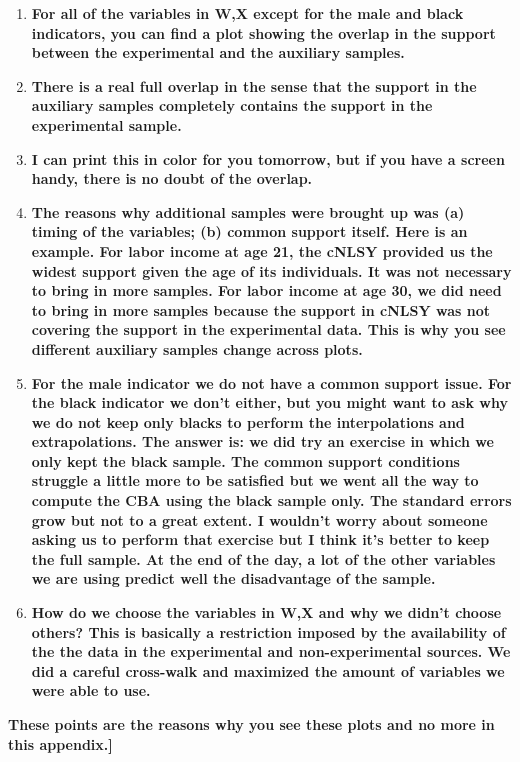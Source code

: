 \begin{enumerate}
\item \textbf{For all of the variables in W,X except for the male and black indicators, you can find a plot showing the overlap in the support between the experimental and the auxiliary samples.} 

\item \textbf{There is a real full overlap in the sense that the support in the auxiliary samples completely contains the support in the experimental sample.} 

\item \textbf{I can print this in color for you tomorrow, but if you have a screen handy, there is no doubt of the overlap.} 

\item \textbf{The reasons why additional samples were brought up was (a) timing of the variables; (b) common support itself. Here is an example. For labor income at age 21, the cNLSY provided us the widest support given the age of its individuals. It was not necessary to bring in more samples. For labor income at age 30, we did need to bring in more samples because the support in cNLSY was not covering the support in the experimental data. This is why you see different auxiliary samples change across plots.}

\item \textbf{For the male indicator we do not have a common support issue. For the black indicator we don't either, but you might want to ask why we do not keep only blacks to perform the interpolations and extrapolations. The answer is: we did try an exercise in which we only kept the black sample. The common support conditions struggle a little more to be satisfied but we went all the way to compute the CBA using the black sample only. The standard errors grow but not to a great extent. I wouldn't worry about someone asking us to perform that exercise but I think it's better to keep the full sample. At the end of the day, a lot of the other variables we are using predict well the disadvantage of the sample.} 

\item  \textbf{How do we choose the variables in W,X and why we didn't choose others? This is basically a restriction imposed by the availability of the the data in the experimental and non-experimental sources. We did a careful cross-walk and maximized the amount of variables we were able to use.} 
\end{enumerate}
\textbf{These points are the reasons why you see these plots and no more in this appendix.]} \\

